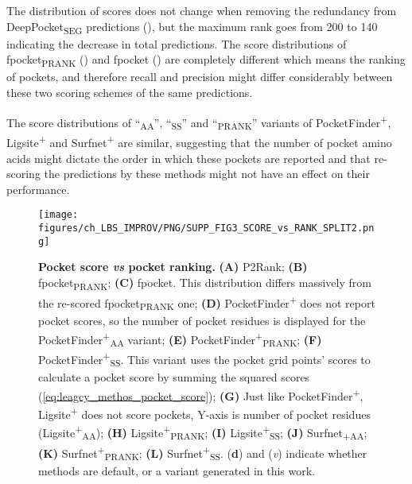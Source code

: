 The distribution of scores does not change when removing the redundancy from DeepPocket\textsubscript{SEG} predictions (), but the maximum rank goes from 200 to 140 indicating the decrease in total predictions. The score distributions of fpocket\textsubscript{PRANK} () and fpocket () are completely different which means the ranking of pockets, and therefore recall and precision might differ considerably between these two scoring schemes of the same predictions.

The score distributions of ``\textsubscript{AA}'', ``\textsubscript{SS}'' and ``\textsubscript{PRANK}'' variants of PocketFinder\textsuperscript{+}, Ligsite\textsuperscript{+} and Surfnet\textsuperscript{+} are similar, suggesting that the number of pocket amino acids might dictate the order in which these pockets are reported  and that re-scoring the predictions by these methods might not have an effect on their performance.


\begin{figure}[htb!]
    \centering
    \texttt{[image: figures/ch\_LBS\_IMPROV/PNG/SUPP\_FIG3\_SCORE\_vs\_RANK\_SPLIT2.png]}
    \caption[Pocket score \textit{vs} pocket ranking]{\textbf{Pocket score \textit{vs} pocket ranking.} \textbf{(A)} P2Rank; \textbf{(B)} fpocket\textsubscript{PRANK}; \textbf{(C)} fpocket. This distribution differs massively from the re-scored fpocket\textsubscript{PRANK} one; \textbf{(D)} PocketFinder\textsuperscript{+} does not report pocket scores, so the number of pocket residues is displayed for the PocketFinder\textsuperscript{+}\textsubscript{AA} variant; \textbf{(E)} PocketFinder\textsuperscript{+}\textsubscript{PRANK}; \textbf{(F)} PocketFinder\textsuperscript{+}\textsubscript{SS}. This variant uses the pocket grid points’ scores to calculate a pocket score by summing the squared scores (\autoref{eq:leagcy_methos_pocket_score}); \textbf{(G)} Just like PocketFinder\textsuperscript{+}, Ligsite\textsuperscript{+} does not score pockets, Y-axis is number of pocket residues (Ligsite\textsuperscript{+}\textsubscript{AA}); \textbf{(H)} Ligsite\textsuperscript{+}\textsubscript{PRANK}; \textbf{(I)} Ligsite\textsuperscript{+}\textsubscript{SS}; \textbf{(J)} Surfnet\textsubscript{+}\textsubscript{AA}; \textbf{(K)} Surfnet\textsuperscript{+}\textsubscript{PRANK}; \textbf{(L)} Surfnet\textsuperscript{+}\textsubscript{SS}. (\textbf{d}) and (\textit{v}) indicate whether methods are default, or a variant generated in this work.}
    \label{fig:pocket_score_vs_rank2}
\end{figure}

